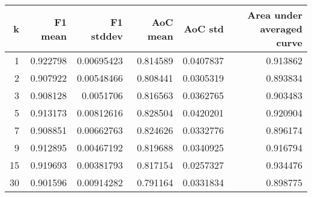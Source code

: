 \begin{tabular}{rrrrrr}
\toprule
   k &   F1 mean &   F1 stddev &   AoC mean &   AoC std &   Area under averaged curve \\
\midrule
   1 &  0.922798 &  0.00695423 &   0.814589 & 0.0407837 &                    0.913862 \\
   2 &  0.907922 &  0.00548466 &   0.808441 & 0.0305319 &                    0.893834 \\
   3 &  0.908128 &  0.0051706  &   0.816563 & 0.0362765 &                    0.903483 \\
   5 &  0.913173 &  0.00812616 &   0.828504 & 0.0420201 &                    0.920904 \\
   7 &  0.908851 &  0.00662763 &   0.824626 & 0.0332776 &                    0.896174 \\
   9 &  0.912895 &  0.00467192 &   0.819688 & 0.0340925 &                    0.916794 \\
  15 &  0.919693 &  0.00381793 &   0.817154 & 0.0257327 &                    0.934476 \\
  30 &  0.901596 &  0.00914282 &   0.791164 & 0.0331834 &                    0.898775 \\
\bottomrule
\end{tabular}